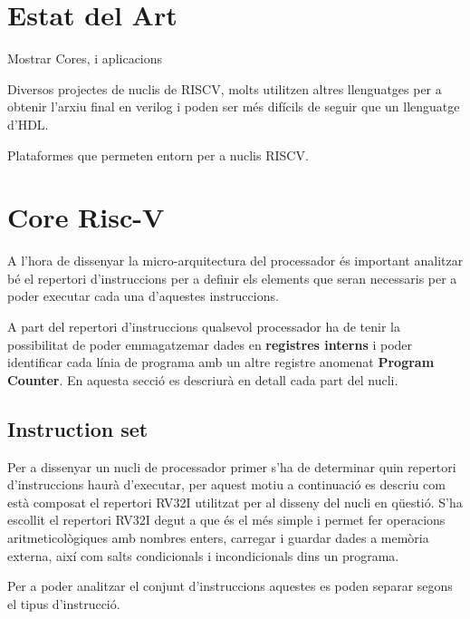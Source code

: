 \documentclass[10pt,a4paper,twocolumn,twoside]{article}
\begin{document}
\section{Estat del Art}
        Mostrar Cores, i aplicacions 
        
        Diversos projectes de nuclis de RISCV, molts utilitzen altres llenguatges per a obtenir l'arxiu final en verilog i poden ser més difícils de seguir que un llenguatge d'HDL.
        
        Plataformes que permeten entorn per a nuclis RISCV.

\section{Core Risc-V}
A l'hora de dissenyar la micro-arquitectura del processador és important analitzar bé el repertori d'instruccions per a definir els elements que seran necessaris per a poder executar cada una d'aquestes instruccions.

A part del repertori d'instruccions qualsevol processador ha de tenir la possibilitat de poder emmagatzemar dades en \textbf{registres interns} i poder identificar cada línia de programa amb un altre registre anomenat\textbf{ Program Counter}.
En aquesta secció es descriurà en detall cada part del nucli. 
    \subsection{Instruction set}
    Per a dissenyar un nucli de processador primer s'ha de determinar quin repertori d'instruccions haurà d'executar, per aquest motiu a continuació es descriu com està composat el repertori RV32I utilitzat per al disseny del nucli en qüestió.
    S'ha escollit el repertori RV32I degut a que és el més simple i permet fer operacions aritmeticològiques amb nombres enters, carregar i guardar dades a memòria externa, així com salts condicionals i incondicionals dins un programa.  
        
    Per a poder analitzar el conjunt d'instruccions aquestes es poden separar segons el tipus d'instrucció.
    
\end{document}
